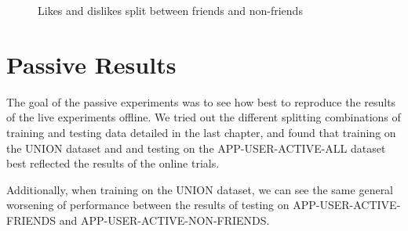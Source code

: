 \begin{figure}[h!]
\caption{Likes and dislikes split between friends and non-friends}
\end{figure}

\section {Passive Results}

The goal of the passive experiments was to see how best to reproduce the results of the live experiments offline. We tried out the different splitting combinations of training and testing data detailed in the last chapter, and found that training on the UNION dataset and and testing on the APP-USER-ACTIVE-ALL dataset best reflected the results of the online trials.

Additionally, when training on the UNION dataset, we can see the same general worsening of performance between the results of testing on APP-USER-ACTIVE-FRIENDS and APP-USER-ACTIVE-NON-FRIENDS.

